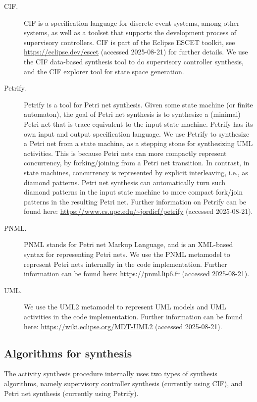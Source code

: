\documentclass{article}
\theoremstyle{definition}
\begin{document}
\begin{description}
	\item[CIF.]
	CIF is a specification language for discrete event systems, among other systems, as well as a toolset that supports the development process of supervisory controllers.
	CIF is part of the Eclipse ESCET toolkit, see \url{https://eclipse.dev/escet} (accessed 2025-08-21) for further details.
	We use the CIF data-based synthesis tool to do supervisory controller synthesis, and the CIF explorer tool for state space generation.
	\item[Petrify.]
	Petrify is a tool for Petri net synthesis.
	Given some state machine (or finite automaton), the goal of Petri net synthesis is to synthesize a (minimal) Petri net that is trace-equivalent to the input state machine.
	Petrify has its own input and output specification language.
	We use Petrify to synthesize a Petri net from a state machine, as a stepping stone for synthesizing UML activities.
	This is because Petri nets can more compactly represent concurrency, by forking/joining from a Petri net transition.
	In contrast, in state machines, concurrency is represented by explicit interleaving, i.e., as diamond patterns.
	Petri net synthesis can automatically turn such diamond patterns in the input state machine to more compact fork/join patterns in the resulting Petri net.
	Further information on Petrify can be found here: \url{https://www.cs.upc.edu/~jordicf/petrify} (accessed 2025-08-21).
	\item[PNML.]
	PNML stands for Petri net Markup Language, and is an XML-based syntax for representing Petri nets.
	We use the PNML metamodel to represent Petri nets internally in the code implementation.
	Further information can be found here: \url{https://pnml.lip6.fr} (accessed 2025-08-21).
	\item[UML.]
	We use the UML2 metamodel to represent UML models and UML activities in the code implementation.
	Further information can be found here: \url{https://wiki.eclipse.org/MDT-UML2} (accessed 2025-08-21).
\end{description}

\subsection{Algorithms for synthesis}
\label{sec:prelims:synthesis}

The activity synthesis procedure internally uses two types of synthesis algorithms, namely supervisory controller synthesis (currently using CIF), and Petri net synthesis (currently using Petrify).
\end{document}

